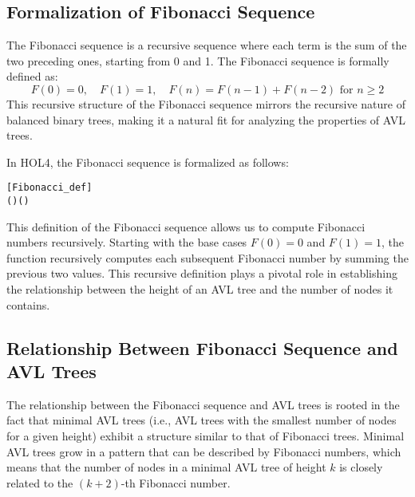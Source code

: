 \documentclass[12pt]{article}
\begin{document}
\subsection{Formalization of Fibonacci Sequence}

The Fibonacci sequence is a recursive sequence where each term is the sum of the two preceding ones, starting from 0 and 1. The Fibonacci sequence is formally defined as:
\[
F(0) = 0, \quad F(1) = 1, \quad F(n) = F(n-1) + F(n-2) \text{ for } n \geq 2
\]
This recursive structure of the Fibonacci sequence mirrors the recursive nature of balanced binary trees, making it a natural fit for analyzing the properties of AVL trees.

In HOL4, the Fibonacci sequence is formalized as follows:

\begin{alltt}
[Fibonacci_def]
  \HOLTokenDefEquality{}
    \HOLSymConst{=}   
     \HOLSymConst{=}   
    ( \HOLSymConst{\ensuremath{-}} ) \HOLSymConst{\ensuremath{+}}  ( \HOLSymConst{\ensuremath{-}} )
\end{alltt}

This definition of the Fibonacci sequence allows us to compute Fibonacci numbers recursively. Starting with the base cases \( F(0) = 0 \) and \( F(1) = 1 \), the function recursively computes each subsequent Fibonacci number by summing the previous two values. This recursive definition plays a pivotal role in establishing the relationship between the height of an AVL tree and the number of nodes it contains.

\subsection{Relationship Between Fibonacci Sequence and AVL Trees}

The relationship between the Fibonacci sequence and AVL trees is rooted in the fact that minimal AVL trees (i.e., AVL trees with the smallest number of nodes for a given height) exhibit a structure similar to that of Fibonacci trees. Minimal AVL trees grow in a pattern that can be described by Fibonacci numbers, which means that the number of nodes in a minimal AVL tree of height \( k \) is closely related to the \( (k+2) \)-th Fibonacci number.
\end{document}
